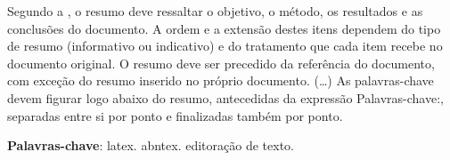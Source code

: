 \begin{resumo}
  Segundo a , o resumo deve ressaltar o
  objetivo, o método, os resultados e as conclusões do documento. A ordem e a extensão
  destes itens dependem do tipo de resumo (informativo ou indicativo) e do
  tratamento que cada item recebe no documento original. O resumo deve ser
  precedido da referência do documento, com exceção do resumo inserido no
  próprio documento. (\ldots) As palavras-chave devem figurar logo abaixo do
  resumo, antecedidas da expressão Palavras-chave:, separadas entre si por
  ponto e finalizadas também por ponto.

  \textbf{Palavras-chave}: latex. abntex. editoração de texto.
\end{resumo}